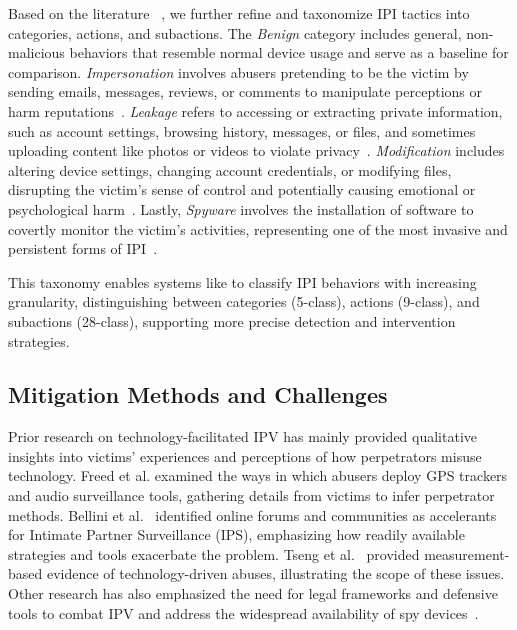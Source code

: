 Based on the literature ~\cite{tseng2020tools,woodlock2017abuse,bellini2023digital,ceccio2023sneaky}, we further refine and taxonomize IPI tactics into categories, actions, and subactions. The \textit{Benign} category includes general, non-malicious behaviors that resemble normal device usage and serve as a baseline for comparison. \textit{Impersonation} involves abusers pretending to be the victim by sending emails, messages, reviews, or comments to manipulate perceptions or harm reputations~\cite{tseng2020tools,woodlock2017abuse}. 
\textit{Leakage} refers to accessing or extracting private information, such as account settings, browsing history, messages, or files, and sometimes uploading content like photos or videos to violate privacy~\cite{ceccio2023sneaky}. \textit{Modification} includes altering device settings, changing account credentials, or modifying files, disrupting the victim’s sense of control and potentially causing emotional or psychological harm~\cite{bellini2023digital}. Lastly, \textit{Spyware} involves the installation of software to covertly monitor the victim’s activities, representing one of the most invasive and persistent forms of IPI~\cite{woodlock2017abuse}.

This taxonomy enables systems like \sys to classify IPI behaviors with increasing granularity, distinguishing between categories (5-class), actions (9-class), and subactions (28-class), supporting more precise detection and intervention strategies.


\subsection{Mitigation Methods and Challenges}

Prior research on technology-facilitated IPV has mainly provided qualitative insights into victims’ experiences and perceptions of how perpetrators misuse technology. Freed et al.\cite{freed2017digital,freed2018stalker} examined the ways in which abusers deploy GPS trackers and audio surveillance tools, gathering details from victims to infer perpetrator methods. Bellini et al.~\cite{bellini2023digital} identified online forums and communities as accelerants for Intimate Partner Surveillance (IPS), emphasizing how readily available strategies and tools exacerbate the problem. Tseng et al.~\cite{tseng2020tools} provided measurement-based evidence of technology-driven abuses, illustrating the scope of these issues. Other research has also emphasized the need for legal frameworks and defensive tools to combat IPV and address the widespread availability of spy devices~\cite{thomas2021sok,ceccio2023sneaky}.

